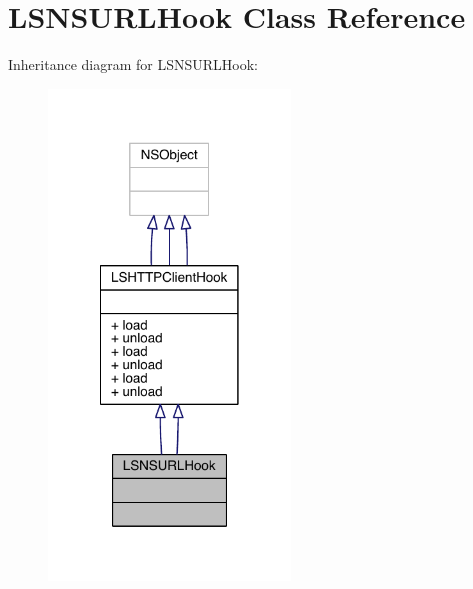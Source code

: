 \hypertarget{interface_l_s_n_s_u_r_l_hook}{\section{L\-S\-N\-S\-U\-R\-L\-Hook Class Reference}
\label{interface_l_s_n_s_u_r_l_hook}
}


Inheritance diagram for L\-S\-N\-S\-U\-R\-L\-Hook\-:\nopagebreak
\begin{figure}[H]
\begin{center}
\leavevmode
\includegraphics[width=182pt]{interface_l_s_n_s_u_r_l_hook__inherit__graph}
\end{center}
\end{figure}


